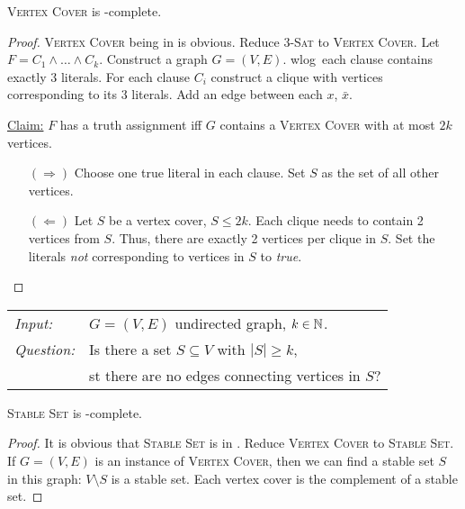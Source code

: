 \documentclass[../skript.tex]{subfiles}
\begin{document}
\begin{theorem} %
\label{thm:8}
\textsc{Vertex Cover} is \NP-complete.
\end{theorem}
\begin{proof}
\textsc{Vertex Cover} being in \NP{} is obvious.
Reduce \textsc{3-Sat} to \textsc{Vertex Cover}.
Let $F = C_1 \wedge \ldots \wedge C_k$. Construct a graph $G = (V, E)$.
\Ac{wlog}\ each clause contains exactly 3 literals.
For each clause $C_i$ construct a clique with vertices corresponding to its 3 literals.
Add an edge between each $x$, $\bar{x}$.

\underline{Claim:} $F$ has a truth assignment \ac{iff} $G$ contains a \textsc{Vertex Cover} with at most $2k$ vertices.
\begin{itemize}
\item[$(\Rightarrow)$] Choose one true literal in each clause. Set $S$ as the set of all other vertices.
\item[$(\Leftarrow)$] Let $S$ be a vertex cover, $S \leq 2k$. Each clique needs to contain 2 vertices from $S$. Thus, there are exactly 2 vertices per clique in $S$.
Set the literals \emph{not} corresponding to vertices in $S$ to \textit{true}.
\end{itemize}
\end{proof}
\begin{problem}
\begin{tabular}{@{}ll}
\textit{Input:} & $G = (V, E)$ undirected graph, $k \in \mathbb{N}$. \\
\textit{Question:} & Is there a set $S \subseteq V$ with $|S| \geq k$, \\
& \ac{st} there are no edges connecting vertices in $S$?
\end{tabular}
\end{problem}
\begin{theorem} %
\label{thm:9}
\textsc{Stable Set} is \NP-complete.
\end{theorem}
\begin{proof}
It is obvious that \textsc{Stable Set} is in \NP.
Reduce \textsc{Vertex Cover} to \textsc{Stable Set}.
If $G = (V, E)$ is an instance of \textsc{Vertex Cover}, then we can find a stable set $S$ in this graph: $V \setminus S$ is a stable set.
Each vertex cover is the complement of a stable set.
\end{proof}
\end{document}
